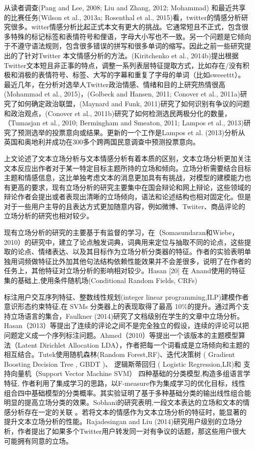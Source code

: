 从读者调查(Pang and Lee, 2008; Liu and Zhang, 2012; Mohammad) 和最近共享的比赛任务(Wilson et al., 2013a; Rosenthal et al., 2015)看，twitter的情感分析研究很多。witter情感分析比起正式本文有更大的挑战。它通常短且不正式，包含很多特殊的标记标签和表情符号和俚语，字母大小写也不一致。另一个问题是它倾向于不遵守语法规则，包含很多错误的拼写和很多单词的缩写。因此之前一些研究提出的了针对Twitter 本文情感分析的方法。(Kiritchenko et al., 2014b)提出根据Twitter文本短且非正事的特点，调整一系列表层特征提取方式，比如存在/没有积极和消极的表情符号、标签、大写的字幕和重复了字母的单词（比如sweeettt）。最近几年，在分析对选举人Twitter政治情感、情绪和目的上研究热情很高(Mohammad et al., 2015)，(Golbeck and Hansen, 2011; Conover et al., 2011a)研究了如何确定政治联盟，(Maynard and Funk, 2011)研究了如何识别有争议的问题和政治观点，(Conover et al., 2011b)研究了如何检测选民两极分化的数量，（Tumasjan et al., 2010; Bermingham and Smeaton, 2011; Lampos et al., 2013)研究了预测选举的投票意向或结果。更新的一个工作是Lampos et al. (2013)分析从英国和奥地利并成功在300多个跨两国民意调查中预测投票意向。


上文论述了文本立场分析与文本情感分析有着本质的区别，文本立场分析更加关注文本反应出作者对于某一特定目标主题所持的立场和倾向。立场分析需要结合目标主题和情感信息，这比单独考虑文本的消息更加具有有挑战，对模型的建模能力也有更高的要求，现有立场分析的研究主要集中在国会辩论和网上辩论，这些领域的辩论作者会提出或者表现出清晰的立场倾向，语法和论述结构也相对固定化。但是对于一些用户主导的且表达方式更加随意内容，例如微博、Twiiter、商品评论的立场分析的研究也相对较少。

现有立场分析的研究的主要基于有监督的学习，在（Somasundaran和Wiebe，2010）的研究中，建立了论点触发词典，词典用来定位与抽取不同的论点，这些提取的论点、情绪表达、以及其目标作为立场分析分类器的特征。作者的实验表明单独用词频做特征比外加其他句法结构依赖性能效果并不会差很多，说明了在作者的任务上，其他特征对立场分析的影响相对较少。Hasan [20] 在 Anand使用的特征集的基础上,使用条件随机场(Conditional Random Fields, CRFs)

标注用户交互序列特征、整数线性规划(integer linear programming,ILP)建模作者意识形态约束特征,在 SVMs 分类器上的表现取得了最高 10\%的提升。通过两个支持立场语言的集合，Faulkner (2014)研究了文档级别在学生的文章中立场分析。Hasan（2013）等提出了连续的评论之间不是完全独立的假设，连续的评论可以把问题定义成一个序列标注问题。Ahmed（2010）等提出一个该版本的主题模型算法（Latent Dirichlet Allocation LDA），作者把每一个词看成是立场倾向和主题的相互结合。Tutek使用随机森林(Random Forest,RF)、迭代决策树 ( Gradient Boosting Decision Tree , GBDT )、 逻辑斯蒂回归 ( Logistic Regression,LR)和 支持向量机（Support Vector Machine SVM） 四种基础的分类模型,构造多组语言学特征, 作者利用了集成学习的思路，以F-measure作为集成学习的优化目标，线性组合四中基础模型的分类概率。其实验证明了基于多种基础分类的输出线性组合能明显的提高立场分类的效果。Sobhani的研究表明,一段文本表达的立场和文本的情感分析存在一定的关联 。若将文本的情感作为文本立场分析的特征时，能显著的提升文本立场分析的性能。Rajadesingan and Liu (2014)研究用户级别的立场分析，作者提出了如果多个Twitter用户转发同一对有争议的话题，那这些用户很大可能拥有同意的立场。

